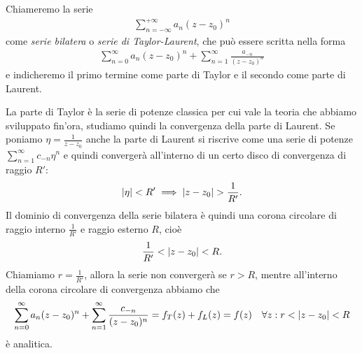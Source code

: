 \begin{definition}
  Chiameremo la serie 
  \begin{align}
    \sum_{n = -\infty}^{+\infty}a_n (z - z_0)^n
  \end{align}
  come \textit{serie bilatera} o \textit{serie di Taylor-Laurent}, che può essere scritta nella forma 
  \begin{align}
    \sum_{n = 0}^{\infty} a_n (z - z_0)^n + \sum_{n = 1}^\infty \frac{a_{-n}}{(z - z_0)^n}
  \end{align}
  e indicheremo il primo termine come parte di Taylor e il secondo come parte di Laurent.
\end{definition}
La parte di Taylor è la serie di potenze classica per cui vale la teoria che abbiamo sviluppato fin'ora, studiamo quindi la convergenza della parte di 
Laurent. Se poniamo $ \eta = \frac{1}{z - z_0} $ anche la parte di Laurent si riscrive come una serie di potenze $ \sum_{n = 1}^\infty c_{-n} \eta^n $ 
e quindi convergerà all'interno di un certo disco di convergenza di raggio $ R' $:
\begin{align}
  \left|{\eta}\right| < R' \implies \left|{z - z_0}\right| > \frac1{R'}.
\end{align}
Il dominio di convergenza della serie bilatera è quindi una corona circolare di raggio interno $ \frac{1}{R'} $ e raggio esterno $ R $, cioè
\begin{align}
  \frac1{R'} < \left|{z - z_0}\right| < R.
\end{align}
Chiamiamo $ r = \frac1{R'} $, allora la serie non convergerà se $ r > R $, mentre all'interno della corona circolare di convergenza abbiamo che 
\begin{align}
  \sum_{n = 0}^{\infty} a_n (z - z_0)^n + \sum_{n = 1}^\infty \frac{c_{-n}}{(z - z_0)^n} 
  = f_T(z) + f_L(z) = f(z) \quad \forall z: r < \left|{z - z_0}\right| < R
\end{align}
è analitica.

